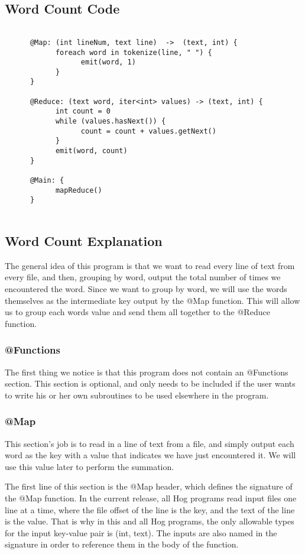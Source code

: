\documentclass{article}
\begin{document}
\subsection*{Word Count Code}
\begin{verbatim}
      
      @Map: (int lineNum, text line)  ->  (text, int) {
            foreach word in tokenize(line, " ") {
                  emit(word, 1)
            }
      }
      
      @Reduce: (text word, iter<int> values) -> (text, int) {
            int count = 0
            while (values.hasNext()) {
                  count = count + values.getNext()
            }
            emit(word, count)
      }
      
      @Main: {
            mapReduce()
      }
      
\end{verbatim}

\subsection*{Word Count Explanation}
The general idea of this program is that we want to read every line of text from every file, and then, grouping by word, output the total number of times we encountered the word. Since we want to group by word, we will use the words themselves as the intermediate key output by the @Map function. This will allow us to group each words value and send them all together to the @Reduce function.

\subsubsection*{@Functions}
The first thing we notice is that this program does not contain an @Functions section. This section is optional, and only needs to be included if the user wants to write his or her own subroutines to be used elsewhere in the program.

\subsubsection*{@Map}
This section's job is to read in a line of text from a file, and simply output each word as the key with a value that indicates we have just encountered it. We will use this value later to perform the summation.

The first line of this section is the @Map header, which defines the signature of the @Map function. In the current release, all Hog programs read input files one line at a time, where the file offset of the line is the key, and the text of the line is the value. That is why in this and all Hog programs, the only allowable types for the input key-value pair is (int, text). The inputs are also named in the signature in order to reference them in the body of the function.
\end{document}
